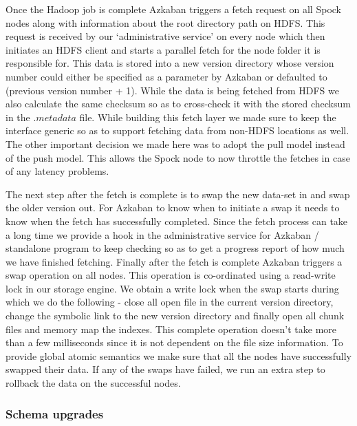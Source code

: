 \documentclass[twocolumn]{article}
\newcommand{\projectname}{Spock}
\begin{document}
Once the Hadoop job is complete Azkaban triggers a fetch request on all \projectname{} nodes along with information about the root directory path on HDFS. This request is received by our `administrative service' on every node which then initiates an HDFS client and starts a parallel fetch for the node folder it is responsible for. This data is stored into a new version directory whose version number could either be specified as a parameter by Azkaban or defaulted to (previous version number + 1). While the data is being fetched from HDFS we also calculate the same checksum so as to cross-check it with the stored checksum in the $.metadata$ file. While building this fetch layer we made sure to keep the interface generic so as to support fetching data from non-HDFS locations as well. The other important decision we made here was to adopt the pull model instead of the push model. This allows the \projectname{} node to now throttle the fetches in case of any latency problems. 

The next step after the fetch is complete is to swap the new data-set in and swap the older version out. For Azkaban to know when to initiate a swap it needs to know when the fetch has successfully completed. Since the fetch process can take a long time we provide a hook in the administrative service for Azkaban / standalone program to keep checking so as to get a progress report of how much we have finished fetching. Finally after the fetch is complete Azkaban triggers a swap operation on all nodes. This operation is co-ordinated using a read-write lock in our storage engine. We obtain a write lock when the swap starts during which we do the following - close all open file in the current version directory, change the symbolic link to the new version directory and finally open all chunk files and memory map the indexes. This complete operation doesn't take more than a few milliseconds since it is not dependent on the file size information. To provide global atomic semantics we make sure that all the nodes have successfully swapped their data. If any of the swaps have failed, we run an extra step to rollback the data on the successful nodes.



\subsubsection{Schema upgrades}
\label{sec:read_only:data_cycle:schema_upgrades}
\end{document}
